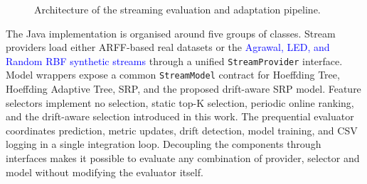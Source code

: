 \documentclass[12pt]{article}
\newcommand{\new}[1]{\textcolor{blue}{#1}}
\begin{document}
\begin{figure}[H]
\centering
{}
\caption{Architecture of the streaming evaluation and adaptation pipeline.}
\label{fig:system_architecture}
\end{figure}

The Java implementation is organised around five groups of classes. Stream
providers load either ARFF-based real datasets or the \new{Agrawal, LED, and
Random RBF synthetic streams} through a unified \texttt{StreamProvider}
interface. Model wrappers expose a
common \texttt{StreamModel} contract for Hoeffding Tree, Hoeffding Adaptive
Tree, SRP, and the proposed drift-aware SRP model. Feature selectors implement
no selection, static top-K selection, periodic online ranking, and the
drift-aware selection introduced in this work. The prequential evaluator
coordinates prediction, metric updates, drift detection, model training, and
CSV logging in a single integration loop. Decoupling the components through
interfaces makes it possible to evaluate any combination of provider, selector
and model without modifying the evaluator itself.
\end{document}
